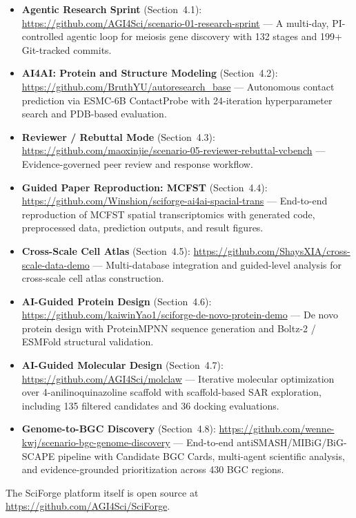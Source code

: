 \documentclass[sn-basic,Numbered,pdflatex]{sn-jnl}
\begin{document}
\begin{itemize}
  \item \textbf{Agentic Research Sprint} (Section~4.1): \url{https://github.com/AGI4Sci/scenario-01-research-sprint} --- A multi-day, PI-controlled agentic loop for meiosis gene discovery with 132 stages and 199+ Git-tracked commits.
  \item \textbf{AI4AI: Protein and Structure Modeling} (Section~4.2): \url{https://github.com/BruthYU/autoresearch_base} --- Autonomous contact prediction via ESMC-6B ContactProbe with 24-iteration hyperparameter search and PDB-based evaluation.
  \item \textbf{Reviewer / Rebuttal Mode} (Section~4.3): \url{https://github.com/maoxinjie/scenario-05-reviewer-rebuttal-vcbench} --- Evidence-governed peer review and response workflow.
  \item \textbf{Guided Paper Reproduction: MCFST} (Section~4.4): \url{https://github.com/Winshion/sciforge-ai4ai-spacial-trans} --- End-to-end reproduction of MCFST spatial transcriptomics with generated code, preprocessed data, prediction outputs, and result figures.
  \item \textbf{Cross-Scale Cell Atlas} (Section~4.5): \url{https://github.com/ShaysXIA/cross-scale-data-demo} --- Multi-database integration and guided-level analysis for cross-scale cell atlas construction.
  \item \textbf{AI-Guided Protein Design} (Section~4.6): \url{https://github.com/kaiwinYao1/sciforge-de-novo-protein-demo} --- De novo protein design with ProteinMPNN sequence generation and Boltz-2 / ESMFold structural validation.
  \item \textbf{AI-Guided Molecular Design} (Section~4.7): \url{https://github.com/AGI4Sci/molclaw} --- Iterative molecular optimization over 4-anilinoquinazoline scaffold with scaffold-based SAR exploration, including 135 filtered candidates and 36 docking evaluations.
  \item \textbf{Genome-to-BGC Discovery} (Section~4.8): \url{https://github.com/wenne-kwj/scenario-bgc-genome-discovery} --- End-to-end antiSMASH/MIBiG/BiG-SCAPE pipeline with Candidate BGC Cards, multi-agent scientific analysis, and evidence-grounded prioritization across 430 BGC regions.
\end{itemize}

\noindent The SciForge platform itself is open source at \url{https://github.com/AGI4Sci/SciForge}.



\end{document}

